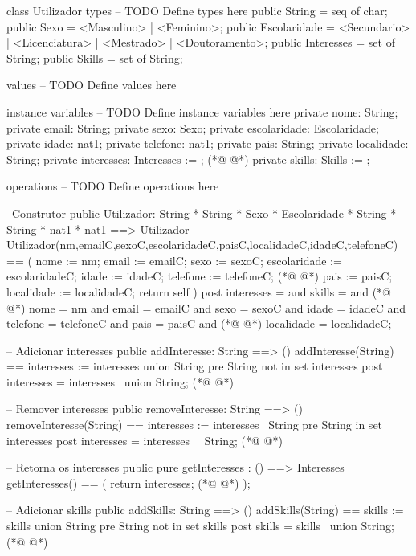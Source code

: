 \begin{vdmpp}[breaklines=true]
class Utilizador
types
-- TODO Define types here
 public String = seq of char;
 public Sexo = <Masculino> | <Feminino>;
 public Escolaridade = <Secundario> | <Licenciatura> | <Mestrado> | <Doutoramento>;
 public Interesses = set of String;
 public Skills = set of String;
 
values
-- TODO Define values here

instance variables
-- TODO Define instance variables here
 private nome: String;
 private email: String;
 private sexo: Sexo;
 private escolaridade: Escolaridade;
 private idade: nat1;
 private telefone: nat1;
 private pais: String;
 private localidade: String;
 private interesses: Interesses := {};
(*@
\label{Utilizador:24}
@*)
 private skills: Skills := {};
 
operations
-- TODO Define operations here

 --Construtor
 public Utilizador: String * String * Sexo * Escolaridade * String * String * nat1 * nat1 ==> Utilizador
 Utilizador(nm,emailC,sexoC,escolaridadeC,paisC,localidadeC,idadeC,telefoneC) == (
  nome := nm;
  email := emailC;
  sexo := sexoC;
  escolaridade := escolaridadeC;
  idade := idadeC;
  telefone := telefoneC;
(*@
\label{addInteresse:38}
@*)
  pais := paisC;
  localidade := localidadeC;
  return self
 )
 post interesses = {} and
   skills = {} and
(*@
\label{removeInteresse:44}
@*)
   nome = nm and
   email = emailC and
   sexo = sexoC and
   idade = idadeC and
   telefone = telefoneC and
   pais = paisC and
(*@
\label{getInteresses:50}
@*)
   localidade = localidadeC;
 
 -- Adicionar interesses
 public addInteresse: String ==> ()
 addInteresse(String) == interesses := interesses union {String}
 pre String not in set interesses
 post interesses = interesses~ union {String};
(*@
\label{addSkills:57}
@*)
 
 -- Remover interesses
 public removeInteresse: String ==> ()
 removeInteresse(String) == interesses := interesses \ {String}
 pre String in set interesses
 post interesses = interesses~ \ {String};
(*@
\label{removeSkills:63}
@*)
 
 -- Retorna os interesses
 public pure getInteresses : () ==> Interesses
 getInteresses() ==
 (
  return interesses;
(*@
\label{getSkills:69}
@*)
 );
 
 -- Adicionar skills
 public addSkills: String ==> ()
 addSkills(String) == skills := skills union {String}
 pre String not in set skills
 post skills = skills~ union {String};
(*@
\label{getNome:76}
@*)
 

\end{vdmpp}
